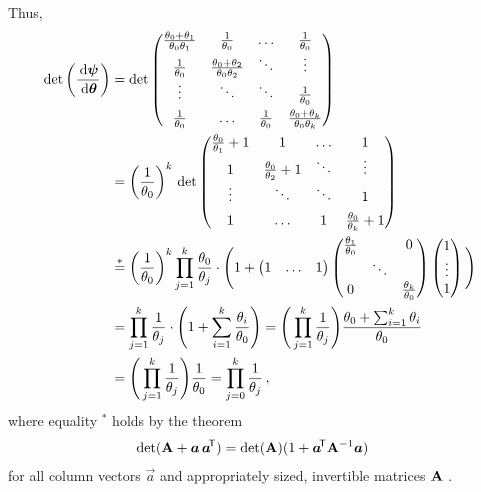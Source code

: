 \allowdisplaybreaks
Thus,
\begin{align*}
\det\left(\frac{\,\mathrm{d}\boldsymbol{\psi}}{\,\mathrm{d}\boldsymbol{\theta}}\right)
&= \det \begin{pmatrix}\frac{\theta_0 + \theta_1}{\theta_0 \theta_1} & \frac{1}{\theta_0} & \hdots & \frac{1}{\theta_0} \\
                       \frac{1}{\theta_0} & \frac{\theta_0 + \theta_2}{\theta_0 \theta_2} & \ddots & \vdots \\
                       \vdots & \ddots & \ddots & \frac{1}{\theta_0} \\[1ex]
                       \frac{1}{\theta_0} & \hdots & \frac{1}{\theta_0} & \frac{\theta_0 + \theta_k}{\theta_0 \theta_k}
        \end{pmatrix} \\
&= \left(\frac{1}{\theta_0}\right)^k\, \det
        \begin{pmatrix}\frac{\theta_0}{\theta_1} + 1 & 1 & \hdots & 1 \\
                       1 & \frac{\theta_0 }{\theta_2} + 1 & \ddots & \vdots \\
                       \vdots & \ddots & \ddots & 1 \\[1ex]
                       1 & \hdots & 1 & \frac{\theta_0}{\theta_k} + 1
        \end{pmatrix} \\
&\stackrel{*}{=} \left(\frac{1}{\theta_0}\right)^k \prod_{j=1}^k \frac{\theta_0}{\theta_j}
                 \cdot \Bigg( 1 + \begin{pmatrix}1 & \hdots & 1\end{pmatrix}
                                  \begin{pmatrix}\frac{\theta_1}{\theta_0} &  & 0 \\
                                                  & \ddots & \\
                                                 0 & & \frac{\theta_k}{\theta_0}\end{pmatrix}
                                  \begin{pmatrix}1 \\ \vdots\\ 1\end{pmatrix}\Bigg)\\
&= \prod_{j=1}^k \frac{1}{\theta_j} \cdot \Bigg( 1 + \sum_{i=1}^k \frac{\theta_i}{\theta_0} \Bigg)
 = \Bigg( \prod_{j=1}^k \frac{1}{\theta_j}\Bigg) \frac{ \theta_0 + \sum_{i=1}^k \theta_i}{\theta_0}\\
&= \Bigg( \prod_{j=1}^k \frac{1}{\theta_j}\Bigg) \frac{1}{\theta_0}
 = \prod_{j=0}^k \frac{1}{\theta_j}\,,
\end{align*}
where equality ${}^*$ holds by the theorem 
\begin{align*}
\det (\mbf{A} + \vec{a}\, \vec{a}^\tra) &= \det(\mbf{A}) (1+\vec{a}^\tra \mbf{A}^{-1} \vec{a}) %
\end{align*}
for all column vectors $\vec{a}$ and appropriately sized, invertible matrices $\mathbf{A}$ 
\parencite[Theorem A 16 (x), Appendix A3, p.~494]{MR2370506}.

